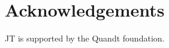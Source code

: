\documentclass[11pt, a4paper]{article}
\begin{document}
\section*{Acknowledgements}
JT is supported by the Quandt foundation.


  

% 


\printbibliography
  
  
\end{document}
